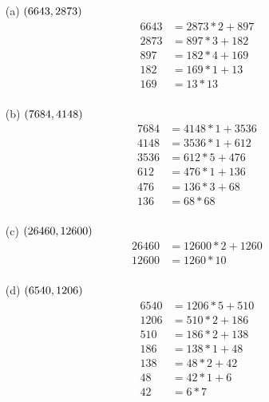 \begin{mdframed}[style=darkAnswer,frametitle={Joe Starr}]
\begin{multicols}{2}
\begin{itemize}
    \item [(a)] {$\left(6643,2873\right)$
    \begin{align*}
        6643&=2873*2+897\\
        2873&=897*3+182\\
        897&=182*4+169\\
        182&=169*1+13\\
        169&=13*13\\
    \end{align*}
    }
    \item [(b)] {$\left(7684,4148\right)$
    \begin{align*}
        7684&=4148*1+3536\\
        4148&=3536*1+612\\
        3536&=612*5+476\\
        612&=476*1+136\\
        476&=136*3+68\\
        136&=68*68\\
    \end{align*}
    }
    \item [(c)] {$\left(26460,12600\right)$
    \begin{align*}
        26460&=12600*2+1260\\
        12600&=1260*10\\
    \end{align*}
    }
\end{itemize}
\end{multicols}
    \begin{multicols}{2}
        \begin{itemize}
    \item [(d)] {$\left(6540,1206\right)$
    \begin{align*}
        6540&=1206*5+510\\
        1206&=510*2+186\\
        510&=186*2+138\\
        186&=138*1+48\\
        138&=48*2+42\\
        48&=42*1+6\\
        42&=6*7\\
    \end{align*}
}
\end{itemize}
\end{multicols}
\end{mdframed}
